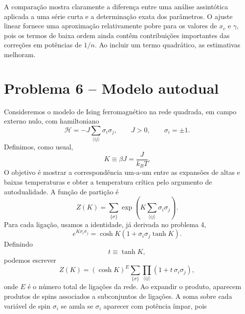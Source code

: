 \documentclass[11pt,a4paper]{article}
\begin{document}
%
A comparação mostra claramente a diferença entre uma análise
assintótica aplicada a uma série curta e a determinação exata dos
parâmetros. O ajuste linear fornece uma aproximação relativamente pobre para os valores de $x_c$ e $\gamma$, pois os termos de baixa ordem ainda contêm contribuições importantes das correções em potências de $1/n$. Ao incluir um termo quadrático, as estimativas melhoram.
\section*{Problema 6 -- Modelo autodual}
Consideremos o modelo de Ising ferromagnético na rede quadrada, em campo externo nulo, com hamiltoniano
%
\begin{equation}
    \mathcal H
    =
    -J\sum_{\langle ij\rangle}\sigma_i\sigma_j,
    \qquad
    J>0,
    \qquad
    \sigma_i=\pm1.
    \label{eq:H_ising_2d_dual}
\end{equation}
%
Definimos, como usual,
%
\begin{equation}
    K\equiv\beta J=\frac{J}{k_BT}.
    \label{eq:K_def}
\end{equation}
%
O objetivo é mostrar a correspondência um-a-um entre as expansões de altas e
baixas temperaturas e obter a temperatura crítica pelo argumento de
autodualidade. A função de partição é
%
\begin{equation}
    Z(K)
    =
    \sum_{\{\sigma\}}
    \exp\left(
        K\sum_{\langle ij\rangle}
        \sigma_i\sigma_j
    \right).
    \label{eq:Z_high_start}
\end{equation}
%
Para cada ligação, usamos a identidade, já derivada no problema 4,
%
\begin{equation}
    e^{K\sigma_i\sigma_j}
    =
    \cosh K
    \left(
        1+\sigma_i\sigma_j\tanh K
    \right).
    \label{eq:high_temp_identity}
\end{equation}
%
Definindo
%
\begin{equation}
    t\equiv\tanh K,
    \label{eq:t_def}
\end{equation}
%
podemos escrever
%
\begin{equation}
    Z(K)
    =
    (\cosh K)^E
    \sum_{\{\sigma\}}
    \prod_{\langle ij\rangle}
    \left(
        1+t\,\sigma_i\sigma_j
    \right),
    \label{eq:high_temp_expansion}
\end{equation}
%
onde \(E\) é o número total de ligações da rede. Ao expandir o produto, aparecem produtos de spins associados a subconjuntos de ligações. A soma sobre cada variável de spin \(\sigma_i\) se anula se \(\sigma_i\) aparecer com potência ímpar, pois
\end{document}

